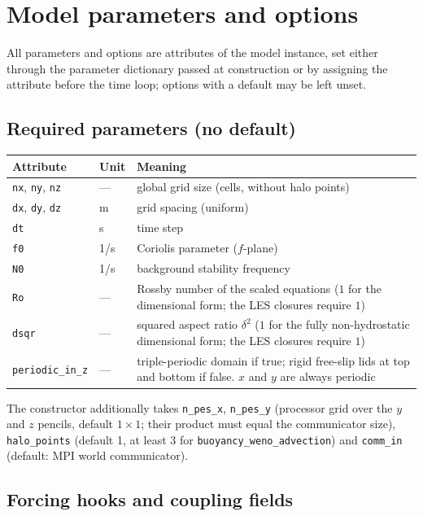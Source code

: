 \documentclass[12pt]{article}
\begin{document}
\section*{Model parameters and options}

All parameters and options are attributes of the model instance, set
either through the parameter dictionary passed at construction or by
assigning the attribute before the time loop; options with a default may
be left unset.

\subsection*{Required parameters (no default)}

\begin{longtable}{@{}llp{8.4cm}@{}}
\hline
Attribute & Unit & Meaning \\
\hline
\endhead
\verb|nx|, \verb|ny|, \verb|nz| & --- & global grid size (cells, without
  halo points) \\
\verb|dx|, \verb|dy|, \verb|dz| & m & grid spacing (uniform) \\
\verb|dt| & s & time step \\
\verb|f0| & 1/s & Coriolis parameter ($f$-plane) \\
\verb|N0| & 1/s & background stability frequency \\
\verb|Ro| & --- & Rossby number of the scaled equations ($1$ for the
  dimensional form; the LES closures require $1$) \\
\verb|dsqr| & --- & squared aspect ratio $\delta^2$ ($1$ for the fully
  non-hydrostatic dimensional form; the LES closures require $1$) \\
\verb|periodic_in_z| & --- & triple-periodic domain if true; rigid
  free-slip lids at top and bottom if false. $x$ and $y$ are always
  periodic \\
\hline
\end{longtable}

\noindent
The constructor additionally takes \verb|n_pes_x|, \verb|n_pes_y|
(processor grid over the $y$ and $z$ pencils, default $1 \times 1$;
their product must equal the communicator size), \verb|halo_points|
(default 1, at least 3 for \verb|buoyancy_weno_advection|) and \verb|comm_in| (default: MPI world communicator).

\subsection*{Forcing hooks and coupling fields}
\end{document}
